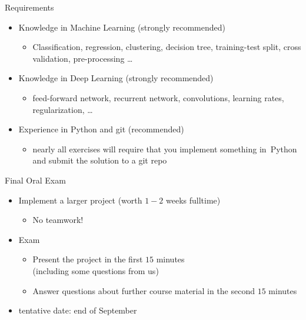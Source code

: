 \begin{frame}[c]{Requirements}

\begin{itemize}
  \item Knowledge in \alert{Machine Learning} (strongly recommended)
  \begin{itemize}
    \item Classification, regression, clustering, decision tree, training-test split, cross validation, pre-processing \ldots
  \end{itemize}
  \pause
  \item Knowledge in \alert{Deep Learning} (strongly recommended)
  \begin{itemize}
    \item feed-forward network, recurrent network, convolutions, learning rates, regularization, \ldots 
  \end{itemize}
  \pause
  \item Experience in \alert{Python and git} (recommended)
  \begin{itemize}
    \item nearly all exercises will require 
    that you implement something in~Python and submit the solution to a git repo
  \end{itemize}
\end{itemize}

\end{frame}
\begin{frame}[c]{Final Oral Exam}

\begin{itemize}
  \item Implement a larger project (worth $1-2$ weeks fulltime)
	\begin{itemize}
		\item No teamwork!
	\end{itemize}
  \item Exam
	\begin{itemize}
		\item Present the project in the first $15$ minutes\\ (including some questions from us)
		\item Answer questions about further course material in the second $15$ minutes
	\end{itemize}	
  \item tentative date: end of September
\end{itemize}

\end{frame}
